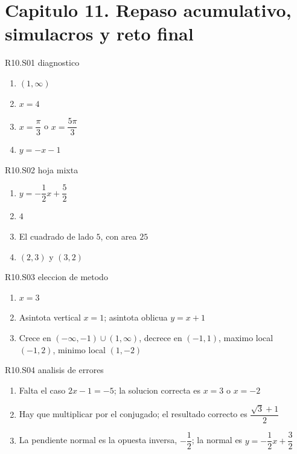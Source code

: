 \section*{Capitulo 11. Repaso acumulativo, simulacros y reto final}

\begin{shortanswer}{R10.S01 diagnostico}
\begin{enumerate}[label=\textbf{PX-R10.S01-\arabic*:}, leftmargin=*]
  \item \((1,\infty)\)
  \item \(x=4\)
  \item \(x=\dfrac{\pi}{3}\) o \(x=\dfrac{5\pi}{3}\)
  \item \(y=-x-1\)
\end{enumerate}
\end{shortanswer}

\begin{shortanswer}{R10.S02 hoja mixta}
\begin{enumerate}[label=\textbf{PX-R10.S02-\arabic*:}, leftmargin=*]
  \item \(y=-\dfrac{1}{2}x+\dfrac{5}{2}\)
  \item \(4\)
  \item El cuadrado de lado \(5\), con area \(25\)
  \item \((2,3)\) y \((3,2)\)
\end{enumerate}
\end{shortanswer}

\begin{shortanswer}{R10.S03 eleccion de metodo}
\begin{enumerate}[label=\textbf{PX-R10.S03-\arabic*:}, leftmargin=*]
  \item \(x=3\)
  \item Asintota vertical \(x=1\); asintota oblicua \(y=x+1\)
  \item Crece en \((-\infty,-1)\cup(1,\infty)\), decrece en \((-1,1)\), maximo local
  \((-1,2)\), minimo local \((1,-2)\)
\end{enumerate}
\end{shortanswer}

\begin{shortanswer}{R10.S04 analisis de errores}
\begin{enumerate}[label=\textbf{PX-R10.S04-\arabic*:}, leftmargin=*]
  \item Falta el caso \(2x-1=-5\); la solucion correcta es \(x=3\) o \(x=-2\)
  \item Hay que multiplicar por el conjugado; el resultado correcto es
  \(\dfrac{\sqrt{3}+1}{2}\)
  \item La pendiente normal es la opuesta inversa, \(-\dfrac{1}{2}\); la normal es
  \(y=-\dfrac{1}{2}x+\dfrac{3}{2}\)
\end{enumerate}
\end{shortanswer}


